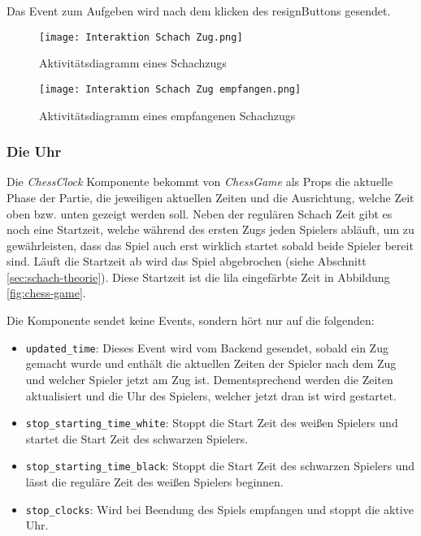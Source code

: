 Das Event zum Aufgeben wird nach dem klicken des \glqq resign\grqq{ }Buttons gesendet.


      \begin{figure}[h]
      \centering
  \texttt{[image: Interaktion Schach Zug.png]}
  \caption{Aktivitätsdiagramm eines Schachzugs}
  \label{fig:chess-move}
\end{figure}

      \begin{figure}[h]
      \centering
  \texttt{[image: Interaktion Schach Zug empfangen.png]}
  \caption{Aktivitätsdiagramm eines empfangenen Schachzugs}
  \label{fig:chess-opponent-move}
\end{figure}

        \subsubsection{Die Uhr}
        \label{sec:Frontend-Uhr}
Die \textit{ChessClock} Komponente bekommt von \textit{ChessGame} als Props die aktuelle Phase der Partie, die jeweiligen aktuellen Zeiten und die Ausrichtung, welche Zeit oben bzw. unten gezeigt werden soll. Neben der regulären Schach Zeit gibt es noch eine Startzeit, welche während des ersten Zugs jeden Spielers abläuft, um zu gewährleisten, dass das Spiel auch erst wirklich startet sobald beide Spieler bereit sind. Läuft die Startzeit ab wird das Spiel abgebrochen (siehe Abschnitt \ref{sec:schach-theorie}). Diese Startzeit ist die lila eingefärbte Zeit in Abbildung \ref{fig:chess-game}.

Die Komponente sendet keine Events, sondern hört nur auf die folgenden:
\begin{itemize}
\item \verb|updated_time|: Dieses Event wird vom Backend gesendet, sobald ein Zug gemacht wurde und enthält die aktuellen Zeiten der Spieler nach dem Zug und welcher Spieler jetzt am Zug ist. Dementsprechend werden die Zeiten aktualisiert und die Uhr des Spielers, welcher jetzt dran ist wird gestartet.
\item \verb|stop_starting_time_white|: Stoppt die Start Zeit des weißen Spielers und startet die Start Zeit des schwarzen Spielers.
\item \verb|stop_starting_time_black|: Stoppt die Start Zeit des schwarzen Spielers und lässt die reguläre Zeit des weißen Spielers beginnen.
\item \verb|stop_clocks|: Wird bei Beendung des Spiels empfangen und stoppt die aktive Uhr.
\end{itemize}

